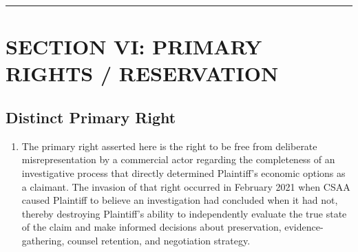 \begin{center}\rule{0.5\linewidth}{0.5pt}\end{center}

\label{toc:section-vi-primary-rights-reservation}
\section{SECTION VI: PRIMARY RIGHTS / RESERVATION}\label{section-vi-primary-rights-reservation}

\subsection{Distinct Primary Right}\label{distinct-primary-right}

\begin{enumerate}
\def\labelenumi{\arabic{enumi}.}
\setcounter{enumi}{40}
\tightlist
\item
  The primary right asserted here is the right to be free from deliberate misrepresentation by a commercial actor regarding the completeness of an investigative process that directly determined Plaintiff's economic options as a claimant. The invasion of that right occurred in February 2021 when CSAA caused Plaintiff to believe an investigation had concluded when it had not, thereby destroying Plaintiff's ability to independently evaluate the true state of the claim and make informed decisions about preservation, evidence-gathering, counsel retention, and negotiation strategy.
\end{enumerate}

